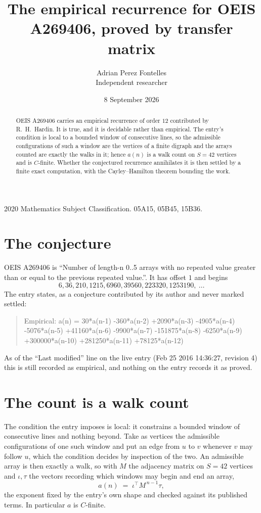 \documentclass[11pt,a4paper]{article}
\title{The empirical recurrence for OEIS A269406, proved by transfer matrix}
\author{Adrian Perez Fontelles\\ \small Independent researcher}
\date{8 September 2026}
\theoremstyle{plain}
\theoremstyle{definition}
\begin{document}
\maketitle

\begin{abstract}
OEIS A269406 carries an empirical recurrence of order $12$ contributed by R.~H.~Hardin. It is
true, and it is decidable rather than empirical. The entry's condition is local to a bounded window of consecutive lines, so
the admissible configurations of such a window are the vertices of a finite digraph and the
arrays counted are exactly the walks in it; hence $a(n)$ is a walk count on $S=42$ vertices
and is $C$-finite. Whether the conjectured recurrence annihilates it is then settled by a
finite exact computation, with the Cayley--Hamilton theorem bounding the work.
\end{abstract}

\noindent\small 2020 Mathematics Subject Classification. 05A15, 05B45, 15B36.\normalsize

\section{The conjecture}

OEIS A269406 is ``Number of length-n 0..5 arrays with no repeated value greater than or equal to the previous repeated value.''. It has offset $1$ and begins
\[
6, 36, 210, 1215, 6960, 39560, 223320, 1253190,\ \dots
\]
The entry states, as a conjecture contributed by its author and never marked settled:
\begin{quote}
Empirical: a(n) = 30*a(n-1) -360*a(n-2) +2090*a(n-3) -4905*a(n-4) -5076*a(n-5) +41160*a(n-6) -9900*a(n-7) -151875*a(n-8) -6250*a(n-9) +300000*a(n-10) +281250*a(n-11) +78125*a(n-12)
\end{quote}
As of the ``Last modified'' line on the live entry (Feb 25 2016 14:36:27, revision 4) this is still
recorded as empirical, and nothing on the entry records it as proved.

\section{The count is a walk count}

The condition the entry imposes is local: it constrains a bounded window of consecutive lines and nothing beyond. Take as
vertices the admissible configurations of one such window and put an edge from $u$ to $v$
whenever $v$ may follow $u$, which the condition decides by inspection of the two. An
admissible array is then exactly a walk, so with $M$ the adjacency matrix on $S=42$ vertices
and $\iota,\tau$ the vectors recording which windows may begin and end an array,
\[
a(n)\;=\;\iota^{\!\top}M^{\,n-1}\tau ,
\]
the exponent fixed by the entry's own shape and checked against its published terms. In
particular $a$ is $C$-finite.
\end{document}

